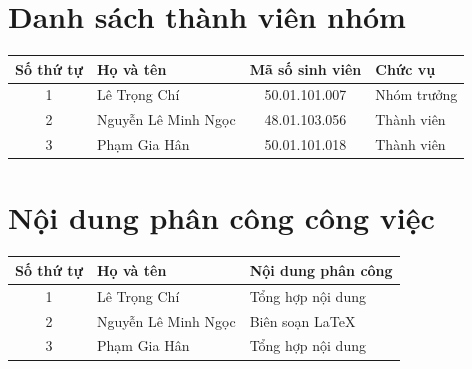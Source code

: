 \documentclass[12pt,a4]{article}
\begin{document}
\begin{titlepage}
\tableofcontents
\newpage

\section{Danh sách thành viên nhóm}
\begin{tabular}{|c|l|c|l|}
    \hline
    \textbf{Số thứ tự} & \textbf{Họ và tên} & \textbf{Mã số sinh viên} & \textbf{Chức vụ} \\ \hline
    1 & Lê Trọng Chí & 50.01.101.007 & Nhóm trưởng \\ \hline
    2 & Nguyễn Lê Minh Ngọc & 48.01.103.056 & Thành viên \\ \hline
    3 & Phạm Gia Hân & 50.01.101.018 & Thành viên \\ \hline
    \end{tabular}
\newpage
\section{Nội dung phân công công việc}
\begin{center}
\begin{tabular}{|c|l|l|}
    \hline
    \textbf{Số thứ tự} & \textbf{Họ và tên} & \textbf{Nội dung phân công} \\ \hline
    1 & Lê Trọng Chí & Tổng hợp nội dung \\ \hline
    2 & Nguyễn Lê Minh Ngọc &Biên soạn \LaTeX \\ \hline
    3 & Phạm Gia Hân & Tổng hợp nội dung\\ \hline
    \end{tabular}
    \end{center}
    \newpage

\end{titlepage}
\end{document}
